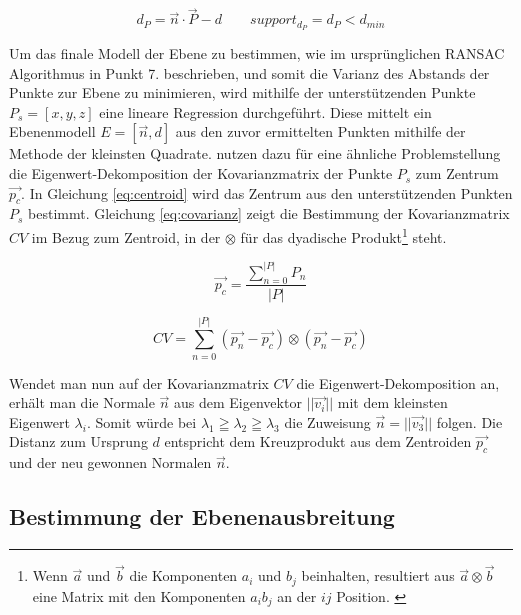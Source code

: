 \begin{equation} \label{eq:plane-distance}
d_P = \vec{n} \cdot \vec{P} - d \qquad support_{d_P} = d_P < d_{min}
\end{equation}

Um das finale Modell der Ebene zu bestimmen, wie im ursprünglichen RANSAC Algorithmus in Punkt 7. beschrieben, und somit die Varianz des Abstands der Punkte zur Ebene zu minimieren, wird mithilfe der unterstützenden Punkte \(P_{s}=\left[x,y,z\right]\) eine lineare Regression durchgeführt. Diese mittelt ein Ebenenmodell \(E=\left[\vec{n}, d\right]\) aus den zuvor ermittelten Punkten mithilfe der Methode der kleinsten Quadrate. \citet{hoppe1992surface} nutzen dazu für eine ähnliche Problemstellung die Eigenwert-Dekomposition der Kovarianzmatrix der Punkte \(P_{s}\) zum Zentrum \(\vec{p_{c}}\). In Gleichung \ref{eq:centroid} wird das Zentrum aus den unterstützenden Punkten \(P_{s}\) bestimmt. Gleichung \ref{eq:covarianz} zeigt die Bestimmung der Kovarianzmatrix \(CV\) im Bezug zum Zentroid, in der \(\otimes\) für das dyadische Produkt\footnote{Wenn \(\vec{a}\) und \(\vec{b}\) die Komponenten \(a_i\) und \(b_j\) beinhalten, resultiert aus \(\vec{a} \otimes \vec{b}\) eine Matrix mit den Komponenten \(a_ib_j\) an der \(ij\) Position. \citep{hoppe1992surface}} steht.

\begin{equation} \label{eq:centroid}
\vec{p_{c}} = \frac{\sum_{n=0}^{|P|} P_{n}}{|P|}
\end{equation}

\begin{equation} \label{eq:covarianz}
CV = \sum_{n=0}^{|P|} ( \vec{p_{n}}- \vec{p_{c}}) \otimes ( \vec{p_{n}}- \vec{p_{c}})
\end{equation}

Wendet man nun auf der Kovarianzmatrix \(CV\) die Eigenwert-Dekomposition an, erhält man die Normale \(\vec{n}\) aus dem Eigenvektor \(||\vec{v_i}||\) mit dem kleinsten Eigenwert \(\lambda_i\). Somit würde bei \(\lambda_1 \geqq \lambda_2 \geqq \lambda_3\) die Zuweisung \(\vec{n} = ||\vec{v_3}||\) folgen. Die Distanz zum Ursprung \(d\) entspricht dem Kreuzprodukt aus dem Zentroiden \(\vec{p_c}\) und der neu gewonnen Normalen \(\vec{n}\). \citep{hoppe1992surface} 

\subsection{Bestimmung der Ebenenausbreitung}

